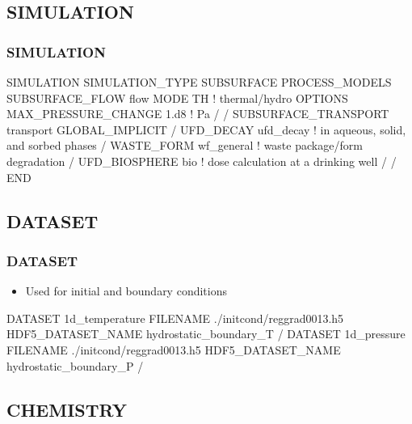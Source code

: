 \documentclass{beamer}
\newcommand\bluecomment[1]{{{\color{blue} #1}}}
\begin{document}
\subsection{SIMULATION}

\begin{frame}[fragile]\frametitle{SIMULATION}

\begin{semiverbatim}\small
SIMULATION
  SIMULATION_TYPE SUBSURFACE
  PROCESS_MODELS
    SUBSURFACE_FLOW flow
      MODE TH \bluecomment{! thermal/hydro}
      OPTIONS
        MAX_PRESSURE_CHANGE 1.d8 \bluecomment{! Pa}
      /   
    /   
    SUBSURFACE_TRANSPORT transport
      GLOBAL_IMPLICIT
    /
    UFD_DECAY ufd_decay \bluecomment{! in aqueous, solid, and sorbed phases}
    /
    WASTE_FORM wf_general \bluecomment{! waste package/form degradation}
    /
    UFD_BIOSPHERE bio \bluecomment{! dose calculation at a drinking well}
    /
  /
END
\end{semiverbatim}

\end{frame}

\subsection{DATASET}

\begin{frame}[fragile]\frametitle{DATASET}

\begin{itemize}
  \item Used for initial and boundary conditions
\end{itemize}

\begin{semiverbatim}
DATASET 1d_temperature
  FILENAME ./initcond/reggrad0013.h5
  HDF5_DATASET_NAME hydrostatic_boundary_T
/
DATASET 1d_pressure
  FILENAME ./initcond/reggrad0013.h5
  HDF5_DATASET_NAME hydrostatic_boundary_P
/
\end{semiverbatim}

\end{frame}

\subsection{CHEMISTRY}
\end{document}
